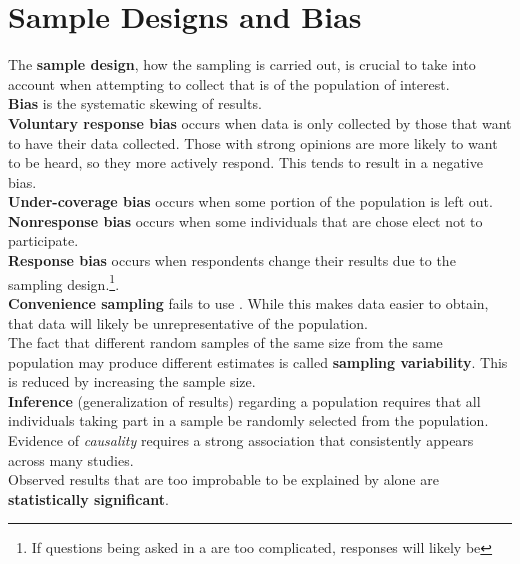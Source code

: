 \documentclass[../AP_Statistics.tex]{subfiles}
\begin{document}
		\section*{Sample Designs and Bias}
		The \textbf{sample design}, how the sampling is carried out, is crucial to take into account when attempting to collect  that is  of the population of interest. \\
		\textbf{Bias} is the systematic skewing of results. \\
		\textbf{Voluntary response bias} occurs when data is only collected by those that want to have their data collected. Those with strong opinions are more likely to want to be heard, so they more actively respond. This tends to result in a negative bias. \\
		\textbf{Under-coverage bias} occurs when some portion of the population is left out. \\
		\textbf{Nonresponse bias} occurs when some individuals that are chose elect not to participate. \\
		\textbf{Response bias} occurs when respondents change their results due to the sampling design.\footnote{If questions being asked in a  are too complicated, responses will likely be }. \\
		\textbf{Convenience sampling} fails to use . While this makes data easier to obtain, that data will likely be unrepresentative of the population. \\
		The fact that different random samples of the same size from the same population may produce different estimates is called \textbf{sampling variability}. This is reduced by increasing the sample size. \\
		\textbf{Inference} (generalization of results) regarding a population requires that all individuals taking part in a sample be randomly selected from the population. \\
		Evidence of \emph{causality} requires a strong association that consistently appears across many studies. \\
		Observed results that are too improbable to be explained by  alone are \textbf{statistically significant}.
\end{document}
